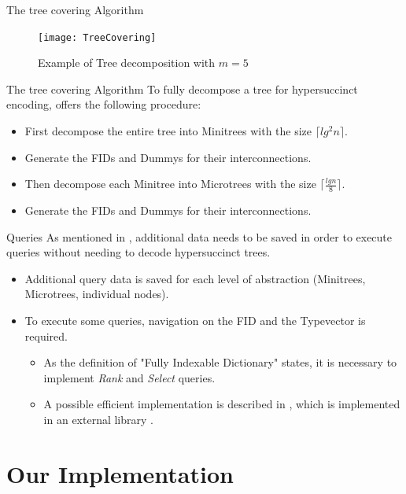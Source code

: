 \documentclass{beamer}
\begin{document}
\begin{frame}{The tree covering Algorithm}
\begin{figure}[t]
	\texttt{[image: TreeCovering]}
\caption{Example of Tree decomposition with $m = 5$ \cite{farzanMunro}}
\end{figure}
\end{frame}

\begin{frame}{The tree covering Algorithm}
	To fully decompose a tree for hypersuccinct encoding, \cite{farzanMunro} offers the following procedure:
	\begin{itemize}
	\item
		First decompose the entire tree into Minitrees with the size $\lceil lg^{2} n \rceil$.
	\item
		Generate the FIDs and Dummys for their interconnections.
	\item
		Then decompose each Minitree into Microtrees with the size $\lceil \frac{lg n}{8} \rceil$.
	\item
		Generate the FIDs and Dummys for their interconnections.
	\end{itemize}
\end{frame}

\begin{frame}{Queries}
	As mentioned in \cite{farzanMunro}, additional data needs to be saved in order to execute queries without needing to decode hypersuccinct trees.
	\begin{itemize}
	\item
		Additional query data is saved for each level of abstraction (Minitrees, Microtrees, individual nodes).
	\item
		To execute some queries, navigation on the FID and the Typevector is required.
		\begin{itemize}
			\item
				As the definition of "Fully Indexable Dictionary" states, it is necessary to implement \textit{Rank} and \textit{Select} queries.
			\item
				A possible efficient implementation is described in \cite{succinctBV}, which is implemented in an external library \cite{succinctBVLink}.
		\end{itemize}
	\end{itemize}
\end{frame}

\section{Our Implementation}
\end{document}
